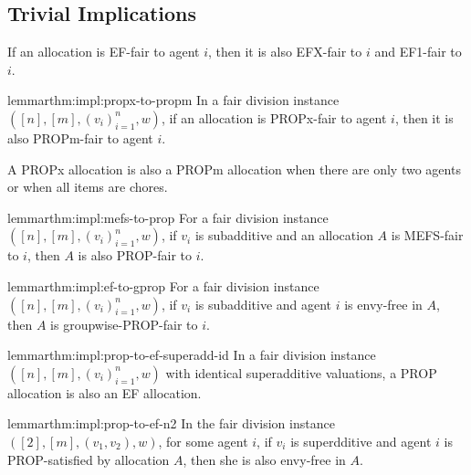 \subsection{Trivial Implications}

\begin{remark}
\label{thm:impl:ef-to-efx+ef1}
If an allocation is EF-fair to agent $i$, then it is also EFX-fair to $i$ and EF1-fair to $i$.
\end{remark}

\begin{restatable}{lemma}{rthm:impl:propx-to-propm}
\label{thm:impl:propx-to-propm}
In a fair division instance $([n], [m], (v_i)_{i=1}^n, w)$,
if an allocation is PROPx-fair to agent $i$, then it is also PROPm-fair to agent $i$.
\end{restatable}

\begin{remark}[PROPm$\implies$PROPx for $n=2$ or chores]
\label{thm:impl:propm-to-propx}
A PROPx allocation is also a PROPm allocation when there are only two agents
or when all items are chores.
\end{remark}

\begin{restatable}{lemma}{rthm:impl:mefs-to-prop}
\label{thm:impl:mefs-to-prop}
For a fair division instance $([n], [m], (v_i)_{i=1}^n, w)$,
if $v_i$ is subadditive and an allocation $A$ is MEFS-fair to $i$, then $A$ is also PROP-fair to $i$.
\end{restatable}

\begin{restatable}{lemma}{rthm:impl:ef-to-gprop}
\label{thm:impl:ef-to-gprop}
For a fair division instance $([n], [m], (v_i)_{i=1}^n, w)$,
if $v_i$ is subadditive and agent $i$ is envy-free in $A$,
then $A$ is groupwise-PROP-fair to $i$.
\end{restatable}

\begin{restatable}{lemma}{rthm:impl:prop-to-ef-superadd-id}
\label{thm:impl:prop-to-ef-superadd-id}
In a fair division instance $([n], [m], (v_i)_{i=1}^n, w)$ with identical superadditive valuations,
a PROP allocation is also an EF allocation.
\end{restatable}

\begin{restatable}[PROP$\implies$EF for $n=2$]{lemma}{rthm:impl:prop-to-ef-n2}
\label{thm:impl:prop-to-ef-n2}
In the fair division instance $([2], [m], (v_1, v_2), w)$, for some agent $i$,
if $v_i$ is superdditive and agent $i$ is PROP-satisfied by allocation $A$,
then she is also envy-free in $A$.
\end{restatable}

